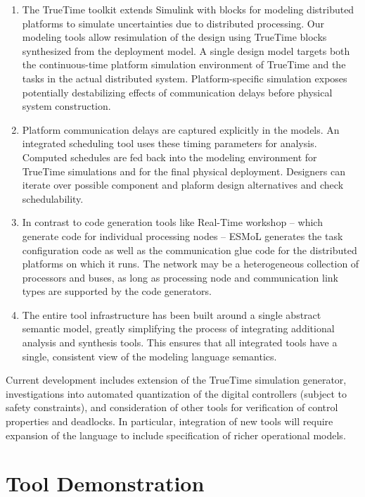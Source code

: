 \begin{enumerate}
\item   The TrueTime
toolkit \cite{TrueTime} extends Simulink with blocks for modeling 
distributed platforms to simulate uncertainties due to distributed processing. 
Our modeling tools allow resimulation of the design using TrueTime
blocks synthesized from the deployment model.  A single design model targets both the 
continuous-time platform simulation environment of TrueTime and the tasks in the 
actual distributed system.  Platform-specific simulation exposes potentially
destabilizing effects of communication delays before physical system construction.
\item Platform communication delays are captured explicitly in the models.
An integrated scheduling tool uses these timing parameters for analysis.  
Computed schedules are fed back into the modeling environment for  
TrueTime simulations and for the final physical deployment.  Designers can 
iterate over possible component and plaform design alternatives and check 
schedulability.
\item In contrast to code generation tools like Real-Time workshop
\cite{mathworks:tools} -- which generate code for individual processing 
nodes -- ESMoL generates the task configuration code as well 
as the communication glue code for the
distributed platforms on which it runs.  The network may be
a heterogeneous collection of processors and buses, as long as processing
node and communication link types are supported by the code generators.
\item The entire tool infrastructure has been built around a
single abstract semantic model, greatly simplifying the process of 
integrating additional analysis and synthesis tools.  This ensures
that all integrated tools have a single, consistent view of the 
modeling language semantics.
\end{enumerate}

Current development includes extension of the TrueTime simulation generator, 
investigations into automated quantization of the digital controllers 
(subject to safety constraints), and consideration of other tools for verification 
of control properties and deadlocks.  In particular, integration of new
tools will require expansion of the language to include
specification of richer operational models.

\section{Tool Demonstration}

